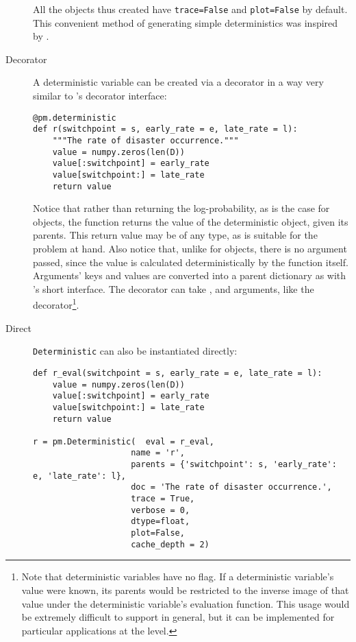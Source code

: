 \begin{description}
All the objects thus created have \texttt{trace=False} and \texttt{plot=False} by default. This convenient method of generating simple deterministics was inspired by \cite{fbc}.

    \item[Decorator] A deterministic variable can be created via a decorator in a way very similar to 's decorator interface:
\begin{verbatim}
@pm.deterministic
def r(switchpoint = s, early_rate = e, late_rate = l):
    """The rate of disaster occurrence."""
    value = numpy.zeros(len(D))
    value[:switchpoint] = early_rate
    value[switchpoint:] = late_rate
    return value
\end{verbatim}
Notice that rather than returning the log-probability, as is the case for  objects, the function returns the value of the deterministic object, given its parents. This return value may be of any type, as is suitable for the problem at hand. Also notice that, unlike for  objects, there is no  argument passed, since the value is calculated deterministically by the function itself. Arguments' keys and values are converted into a parent dictionary as with 's short interface. The  decorator can take ,  and  arguments, like the  decorator\footnote{Note that deterministic variables have no  flag. If a deterministic variable's value were known, its parents would be restricted to the inverse image of that value under the deterministic variable's evaluation function. This usage would be extremely difficult to support in general, but it can be implemented for particular applications at the  level.}.

    \item[Direct] \texttt{Deterministic} can also be instantiated directly:
\begin{verbatim}
def r_eval(switchpoint = s, early_rate = e, late_rate = l):
    value = numpy.zeros(len(D))
    value[:switchpoint] = early_rate
    value[switchpoint:] = late_rate
    return value

r = pm.Deterministic(  eval = r_eval,
                    name = 'r',
                    parents = {'switchpoint': s, 'early_rate': e, 'late_rate': l},
                    doc = 'The rate of disaster occurrence.',
                    trace = True,
                    verbose = 0,
                    dtype=float,
                    plot=False,
                    cache_depth = 2)
\end{verbatim}
\end{description}


